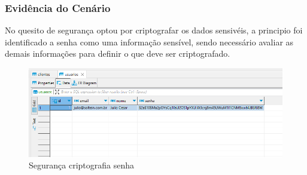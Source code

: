 \subsubsection{Evidência do Cenário \avcen} 

No quesito de segurança optou por criptografar os dados sensivéis, a principio foi identificado a senha como uma informação sensível, sendo necessário 
avaliar as demais informações para definir o que deve ser criptografado.

\begin{figure}[ht]
    \centering
    \includegraphics[width=1\textwidth]{senha_criptografada.png}
    \caption{Segurança criptografia senha}
    \label{fig:Segurança criptografia senha}
 \end{figure}

\pgfmathtruncatemacro{}
